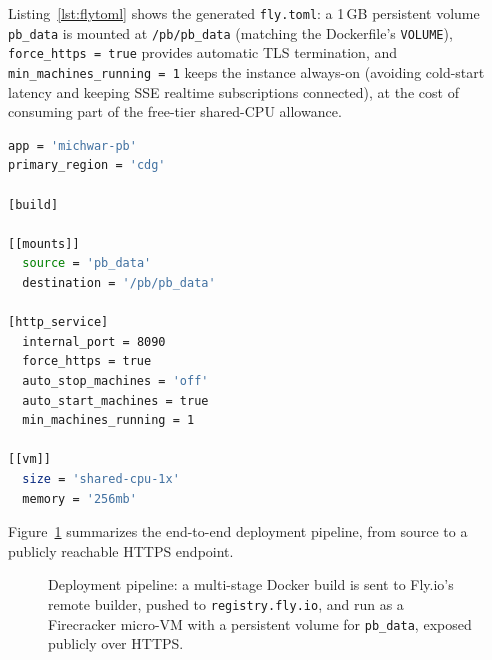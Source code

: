 \documentclass[11pt,a4paper]{article}
\begin{document}
Listing~\ref{lst:flytoml} shows the generated \texttt{fly.toml}: a 1\,GB
persistent volume \texttt{pb\_data} is mounted at \texttt{/pb/pb\_data} (matching
the Dockerfile's \texttt{VOLUME}), \texttt{force\_https = true} provides
automatic TLS termination, and \texttt{min\_machines\_running = 1} keeps the
instance always-on (avoiding cold-start latency and keeping SSE realtime
subscriptions connected), at the cost of consuming part of the free-tier
shared-CPU allowance.

\begin{lstlisting}[language=bash,caption={\texttt{pocketbase/fly.toml} --- Fly.io application configuration.},label={lst:flytoml}]
app = 'michwar-pb'
primary_region = 'cdg'

[build]

[[mounts]]
  source = 'pb_data'
  destination = '/pb/pb_data'

[http_service]
  internal_port = 8090
  force_https = true
  auto_stop_machines = 'off'
  auto_start_machines = true
  min_machines_running = 1

[[vm]]
  size = 'shared-cpu-1x'
  memory = '256mb'
\end{lstlisting}

Figure~\ref{fig:pipeline} summarizes the end-to-end deployment pipeline,
from source to a publicly reachable HTTPS endpoint.

\begin{figure}[htbp]
\centering
{}
\caption{Deployment pipeline: a multi-stage Docker build is sent to Fly.io's
remote builder, pushed to \texttt{registry.fly.io}, and run as a Firecracker
micro-VM with a persistent volume for \texttt{pb\_data}, exposed publicly over
HTTPS.}
\label{fig:pipeline}
\end{figure}
\end{document}

